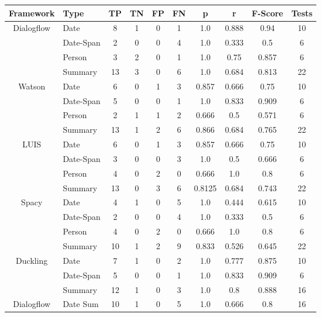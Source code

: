\begin{table}[h]
    \centering
    \begin{tabular}{ c | l | c | c | c | c | c | c | c | c }
        Framework & Type & TP & TN & FP & FN & p & r & F-Score & Tests \\ \hline \hline
        \multirow{4}{*}{Dialogflow} 
        & Date & 8 & 1 & 0 & 1 & 1.0 & 0.888 & 0.94 & 10 \\ 
        & Date-Span & 2 & 0 & 0 & 4 & 1.0 & 0.333 & 0.5 & 6 \\ 
        & Person & 3 & 2 & 0 & 1 & 1.0 & 0.75 & 0.857 & 6 \\ \cline{2-10}
        & Summary & 13 & 3 & 0 & 6 & 1.0 & 0.684 & 0.813 & 22 \\ \hline
        \multirow{4}{*}{Watson} 
        & Date & 6 & 0 & 1 & 3 & 0.857 & 0.666 & 0.75 & 10 \\ 
        & Date-Span & 5 & 0 & 0 & 1 & 1.0 & 0.833 & 0.909 & 6 \\ 
        & Person &  2 & 1 & 1 & 2 & 0.666 & 0.5 & 0.571 & 6 \\ \cline{2-10}
        & Summary & 13 & 1 & 2 & 6 & 0.866 & 0.684 & 0.765 & 22 \\ \hline
        \multirow{4}{*}{LUIS} 
        & Date & 6 & 0 & 1 & 3 & 0.857 & 0.666 & 0.75 & 10 \\ 
        & Date-Span & 3 & 0 & 0 & 3 & 1.0 & 0.5 & 0.666 & 6 \\ 
        & Person & 4 & 0 & 2 & 0 & 0.666 & 1.0 & 0.8 & 6 \\ \cline{2-10}
        & Summary & 13  & 0 & 3 & 6 & 0.8125 & 0.684 & 0.743 & 22 \\ \hline
        \multirow{4}{*}{Spacy} 
        & Date & 4 & 1 & 0 & 5 & 1.0 & 0.444 & 0.615 & 10 \\ 
        & Date-Span & 2 & 0 & 0 & 4 & 1.0 & 0.333 & 0.5 & 6 \\ 
        & Person & 4 & 0 & 2 & 0 & 0.666 & 1.0 & 0.8 & 6 \\ \cline{2-10}
        & Summary & 10 & 1 & 2 & 9 & 0.833 & 0.526 & 0.645 & 22 \\ \hline
        \multirow{3}{*}{Duckling} 
        & Date & 7 & 1 & 0 & 2 & 1.0 & 0.777 & 0.875 & 10 \\ 
        & Date-Span & 5 & 0 & 0 & 1 & 1.0 & 0.833 & 0.909 & 6 \\ \cline{2-10}
        & Summary & 12 & 1 & 0 & 3 & 1.0 & 0.8 & 0.888 & 16 \\ \hline
        Dialogflow & Date Sum & 10 & 1 & 0 & 5 & 1.0 & 0.666 & 0.8 & 16 \\ \hline

\end{tabular}
\end{table}
